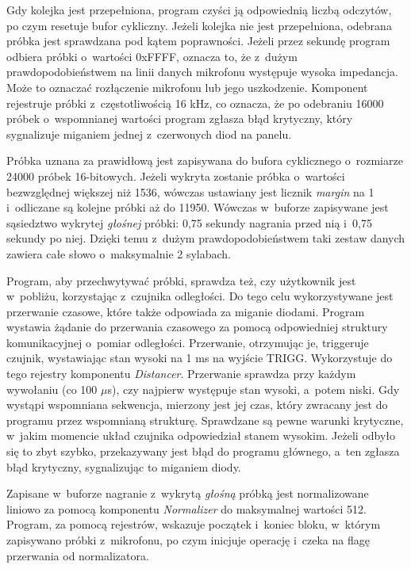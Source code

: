 Gdy kolejka jest przepełniona, program czyści ją odpowiednią liczbą odczytów, po czym resetuje bufor cykliczny. Jeżeli kolejka nie jest przepełniona, odebrana próbka jest sprawdzana pod kątem poprawności. Jeżeli przez sekundę program odbiera próbki o~wartości 0xFFFF, oznacza to, że z~dużym prawdopodobieństwem na linii danych mikrofonu występuje wysoka impedancja. Może to oznaczać rozłączenie mikrofonu lub jego uszkodzenie. Komponent rejestruje próbki z~częstotliwością 16 kHz, co oznacza, że po odebraniu 16000 próbek o~wspomnianej wartości program zgłasza błąd krytyczny, który sygnalizuje miganiem jednej z~czerwonych diod na panelu.

Próbka uznana za prawidłową jest zapisywana do bufora cyklicznego o~rozmiarze 24000 próbek 16-bitowych. Jeżeli wykryta zostanie próbka o~wartości bezwzględnej większej niż 1536, wówczas ustawiany jest licznik \textit{margin} na 1 i~odliczane są kolejne próbki aż do 11950. Wówczas w~buforze zapisywane jest sąsiedztwo wykrytej \textit{głośnej} próbki: 0,75 sekundy nagrania przed nią i~0,75 sekundy po niej. Dzięki temu z~dużym prawdopodobieństwem taki zestaw danych zawiera całe słowo o~maksymalnie 2 sylabach.

Program, aby przechwytywać próbki, sprawdza też, czy użytkownik jest w~pobliżu, korzystając z~czujnika odległości. Do tego celu wykorzystywane jest przerwanie czasowe, które także odpowiada za miganie diodami. Program wystawia żądanie do przerwania czasowego za pomocą odpowiedniej struktury komunikacyjnej o~pomiar odległości. Przerwanie, otrzymując je, triggeruje czujnik, wystawiając stan wysoki na 1 ms na wyjście TRIGG. Wykorzystuje do tego rejestry komponentu \textit{Distancer}. Przerwanie sprawdza przy każdym wywołaniu (co 100 $\mu$s), czy najpierw występuje stan wysoki, a~potem niski. Gdy wystąpi wspomniana sekwencja, mierzony jest jej czas, który zwracany jest do programu przez wspomnianą strukturę. Sprawdzane są pewne warunki krytyczne, w~jakim momencie układ czujnika odpowiedział stanem wysokim. Jeżeli odbyło się to zbyt szybko, przekazywany jest błąd do programu głównego, a~ten zgłasza błąd krytyczny, sygnalizując to miganiem diody.

Zapisane w~buforze nagranie z~wykrytą \textit{głośną} próbką jest normalizowane liniowo za pomocą komponentu \textit{Normalizer} do maksymalnej wartości 512. Program, za pomocą rejestrów, wskazuje początek i~koniec bloku, w~którym zapisywano próbki z~mikrofonu, po czym inicjuje operację i~czeka na flagę przerwania od normalizatora.

